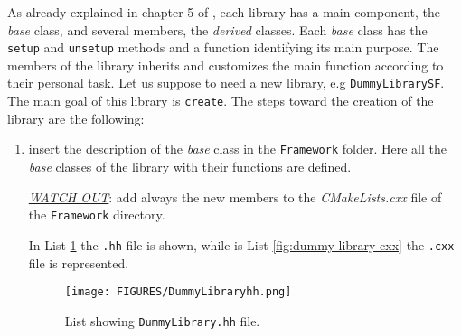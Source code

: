 \documentclass[11pt,a4paper,oneside]{article}
\begin{document}
As already explained in chapter 5 of \cite{deamicisthesis}, each library has a main component, the \textit{base} class, and several members, the \textit{derived} classes. 
Each \textit{base} class has the \texttt{setup} and \texttt{unsetup} methods and a function identifying its main purpose. The members of the library inherits and customizes the main function according to their personal task.
\newline
Let us suppose to need a new library, e.g \texttt{DummyLibrarySF}. The main goal of this library is \texttt{create}.
\newline
The steps toward the creation of the library are the following:
\begin{enumerate}
\item{insert the description of the \textit{base} class in the \texttt{Framework} folder. Here all the \textit{base} classes of the library with their functions are defined.

\underline{\emph{WATCH OUT}}: add always the new members to the \textit{CMakeLists.cxx} file of the \texttt{Framework} directory.

In List \ref{fig:dummy library hh} the \texttt{.hh} file is shown, while is List \ref{fig:dummy library cxx} the \texttt{.cxx} file is represented.

\begin{figure}[htp]
\center
\texttt{[image: FIGURES/DummyLibraryhh.png]}
\caption{List showing \texttt{DummyLibrary.hh} file.} \label{fig:dummy library hh}
\end{figure}

}
\end{enumerate}
\end{document}

